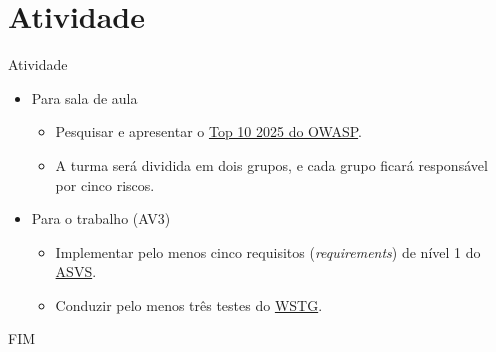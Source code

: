 \documentclass{beamer}
\begin{document}
\section{Atividade}

\begin{frame}{Atividade}
    \begin{itemize}
        \justifying
        \item Para sala de aula
        	\begin{itemize}
        		\justifying
        		\item Pesquisar e apresentar o \href{https://owasp.org/Top10/2025/0x00_2025-Introduction/}{Top 10 2025 do OWASP}.
        		\item A turma será dividida em dois grupos, e cada grupo ficará responsável por cinco riscos.
        	\end{itemize}
        \item Para o trabalho (AV3)
        	\begin{itemize}
        		\item Implementar pelo menos cinco requisitos (\textit{requirements}) de nível 1 do \href{https://raw.githubusercontent.com/OWASP/ASVS/v5.0.0/5.0/OWASP_Application_Security_Verification_Standard_5.0.0_en.pdf}{ASVS}.
        		\item Conduzir pelo menos três testes do \href{https://owasp.org/www-project-web-security-testing-guide/stable/}{WSTG}.
        	\end{itemize}
    \end{itemize}
\end{frame}



\begin{frame}
    \centering
    \Large
    FIM
\end{frame}
    
\end{document}
